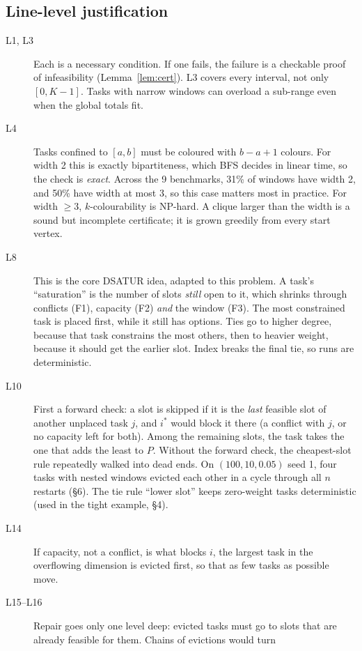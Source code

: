 \subsection{Line-level justification}
\begin{description}
\item[L1, L3] Each is a necessary condition. If one fails, the failure is a
  checkable proof of infeasibility (Lemma~\ref{lem:cert}). L3 covers every
  interval, not only $[0,K-1]$. Tasks with narrow windows can overload a
  sub-range even when the global totals fit.
\item[L4] Tasks confined to $[a,b]$ must be coloured with $b-a+1$ colours.
  For width 2 this is exactly bipartiteness, which BFS decides in linear
  time, so the check is \emph{exact}. Across the 9 benchmarks, 31\% of
  windows have width 2, and 50\% have width at most 3, so this case
  matters most in practice. For width $\ge 3$,
  $k$-colourability is NP-hard. A clique larger than the width is a sound
  but incomplete certificate; it is grown greedily from every start vertex.
\item[L8] This is the core DSATUR idea, adapted to this problem. A task's
  ``saturation'' is the number of slots \emph{still} open to it, which
  shrinks through conflicts (F1), capacity (F2) \emph{and} the window (F3).
  The most constrained task is placed first, while it still has options.
  Ties go to higher degree, because that task constrains the most others,
  then to heavier weight, because it should get the earlier slot. Index
  breaks the final tie, so runs are deterministic.
\item[L10] First a forward check: a slot is skipped if it is the
  \emph{last} feasible slot of another unplaced task $j$, and $i^\ast$
  would block it there (a conflict with $j$, or no capacity left for both).
  Among the remaining slots, the task takes the one that adds the least to
  $P$. Without the forward check, the cheapest-slot rule repeatedly walked
  into dead ends. On $(100,10,0.05)$ seed 1, four tasks with nested windows
  evicted each other in a cycle through all $n$ restarts (\S6). The tie
  rule ``lower slot'' keeps zero-weight tasks deterministic (used in the
  tight example, \S4).
\item[L14] If capacity, not a conflict, is what blocks $i$, the largest
  task in the overflowing dimension is evicted first, so that as few tasks
  as possible move.
\item[L15--L16] Repair goes only one level deep: evicted tasks must go to
  slots that are already feasible for them. Chains of evictions would turn

\end{description}
